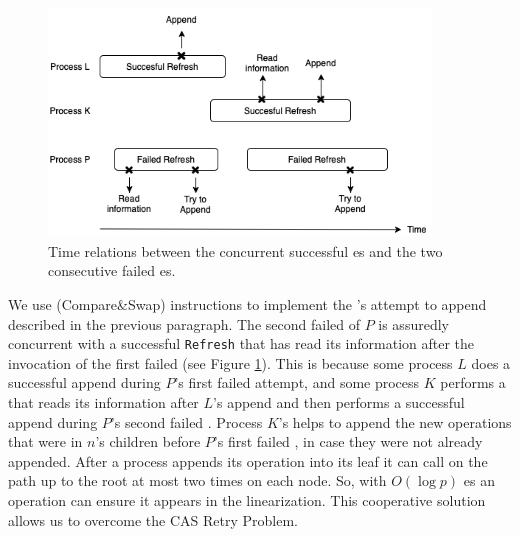 \begin{figure}[hbpt]
  \center\includegraphics[width=4in]{pics/doublyrefresh-drawio.png}
  \caption[Two consecutive failed es by a
    process.]{\label{fig::simpleDoubleRefresh}Time relations between
    the concurrent successful es and the two consecutive
    failed es.} 
\end{figure}
We use  (Compare\&Swap) instructions to implement the
's attempt to append  described in the previous
paragraph. 
The second failed  of $P$ is assuredly concurrent with a
successful \texttt{Refresh} that has read its information after the
invocation of the first failed  (see Figure
\ref{fig::simpleDoubleRefresh}). This is because some process $L$ does
a successful append during $P$'s first failed attempt, and some
process $K$ performs a  that reads its information after
$L$'s append and then performs a successful append during $P$'s second
failed . Process $K$'s  helps to append the
new operations that were in $n$'s children before $P$'s first failed
, in case they were not already appended. After a process
appends its operation into its leaf it can call  on the
path up to the root at most two times on each node. So, with $O(\log
p)$ es an operation can ensure it appears in the
linearization. This cooperative solution allows us to overcome the CAS
Retry Problem. 


